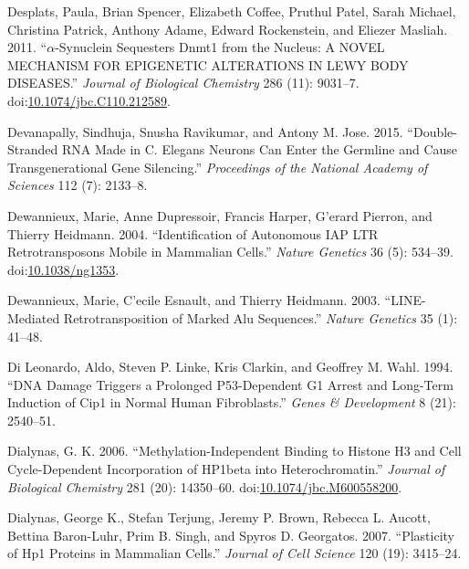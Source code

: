 \documentclass[onehalf,12pt]{beavtex}
\begin{document}
  \hypertarget{ref-DesplatsaSynucleinSequestersDnmt12011}{}
  Desplats, Paula, Brian Spencer, Elizabeth Coffee, Pruthul Patel, Sarah
  Michael, Christina Patrick, Anthony Adame, Edward Rockenstein, and
  Eliezer Masliah. 2011. ``\(\alpha\)-Synuclein Sequesters Dnmt1 from the
  Nucleus: A NOVEL MECHANISM FOR EPIGENETIC ALTERATIONS IN LEWY BODY
  DISEASES.'' \emph{Journal of Biological Chemistry} 286 (11): 9031--7.
  doi:\href{https://doi.org/10.1074/jbc.C110.212589}{10.1074/jbc.C110.212589}.
  
  \hypertarget{ref-DevanapallyDoublestrandedRNAmade2015}{}
  Devanapally, Sindhuja, Snusha Ravikumar, and Antony M. Jose. 2015.
  ``Double-Stranded RNA Made in C. Elegans Neurons Can Enter the Germline
  and Cause Transgenerational Gene Silencing.'' \emph{Proceedings of the
  National Academy of Sciences} 112 (7): 2133--8.
  
  \hypertarget{ref-DewannieuxIdentificationautonomousIAP2004}{}
  Dewannieux, Marie, Anne Dupressoir, Francis Harper, G\a'erard Pierron,
  and Thierry Heidmann. 2004. ``Identification of Autonomous IAP LTR
  Retrotransposons Mobile in Mammalian Cells.'' \emph{Nature Genetics} 36
  (5): 534--39. doi:\href{https://doi.org/10.1038/ng1353}{10.1038/ng1353}.
  
  \hypertarget{ref-DewannieuxLINEmediatedretrotranspositionmarked2003}{}
  Dewannieux, Marie, C\a'ecile Esnault, and Thierry Heidmann. 2003.
  ``LINE-Mediated Retrotransposition of Marked Alu Sequences.''
  \emph{Nature Genetics} 35 (1): 41--48.
  
  \hypertarget{ref-DiLeonardoDNAdamagetriggers1994}{}
  Di Leonardo, Aldo, Steven P. Linke, Kris Clarkin, and Geoffrey M. Wahl.
  1994. ``DNA Damage Triggers a Prolonged P53-Dependent G1 Arrest and
  Long-Term Induction of Cip1 in Normal Human Fibroblasts.'' \emph{Genes
  \& Development} 8 (21): 2540--51.
  
  \hypertarget{ref-DialynasMethylationindependentBindingHistone2006}{}
  Dialynas, G. K. 2006. ``Methylation-Independent Binding to Histone H3
  and Cell Cycle-Dependent Incorporation of HP1beta into
  Heterochromatin.'' \emph{Journal of Biological Chemistry} 281 (20):
  14350--60.
  doi:\href{https://doi.org/10.1074/jbc.M600558200}{10.1074/jbc.M600558200}.
  
  \hypertarget{ref-DialynasPlasticityHP1proteins2007}{}
  Dialynas, George K., Stefan Terjung, Jeremy P. Brown, Rebecca L. Aucott,
  Bettina Baron-Luhr, Prim B. Singh, and Spyros D. Georgatos. 2007.
  ``Plasticity of Hp1 Proteins in Mammalian Cells.'' \emph{Journal of Cell
  Science} 120 (19): 3415--24.
  
\end{document}
